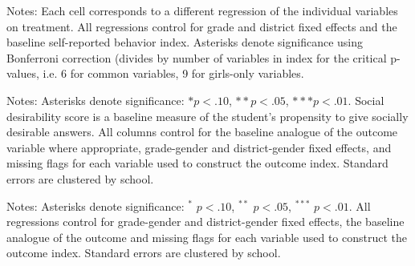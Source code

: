 \documentclass[letterpaper,12pt,pdftex]{article}
\begin{document}
\clearpage
\newpage

\begin{table}
\tabcolsep=3pt
		\caption{Treatment effects on components of self-reported behavior index, with Bonferroni correction (EL1)}
		\label{tab_behatt_ivars_el1}
		\begin{center}
			\footnotesize{}
		\end{center}
\flushleft \footnotesize {Notes: Each cell corresponds to a different regression of the individual variables on treatment. All regressions control for grade and district fixed effects and the baseline self-reported behavior index. Asterisks denote significance using Bonferroni correction (divides by number of variables in index for the critical p-values, i.e. 6 for common variables, 9 for girls-only variables.}
\end{table}

\clearpage
\newpage



\begin{landscape}
\footnotesize
\begin{table}
	\footnotesize
	\caption{Robustness check for social desirability bias using continuous measure}\label{tab_sds_cont_std}
	\begin{center}
	
\end{center}
\flushleft \footnotesize {Notes: Asterisks denote significance: $* p < .10$, $** p < .05$, $*** p < .01$. Social desirability score is a baseline measure of the student's propensity to give socially desirable answers. All columns control for the baseline analogue of the outcome variable where appropriate, grade-gender and district-gender fixed effects, and missing flags for each variable used to construct the outcome index. Standard errors are clustered by school. }
\end{table}
\end{landscape}

\clearpage
\newpage

\begin{table}
	\tabcolsep=1.8pt
	\caption{Heterogeneity by gender, controlling for heterogeneity by BL attitudes}
	\label{tab_gender_satt_bl}
	\vspace{.4cm}
	\begin{center}
		\small
		
	\end{center}
	\flushleft \footnotesize {Notes: Asterisks denote significance: $^*$ $p < .10$, $^{**}$ $p < .05$, $^{***}$ $p < .01$. All regressions control for grade-gender and district-gender fixed effects, the baseline analogue of the outcome and missing flags for each variable used to construct the outcome index. Standard errors are clustered by school.}
\end{table}
\end{document}
